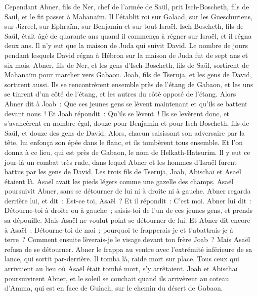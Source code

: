 \begin{multicols}{2}
Cependant Abner, fils de Ner, chef de l'armée de Saül, prit Isch-Boscheth, fils de Saül, et le fit passer à Mahanaïm.
Il l'établit roi sur Galaad, sur les Gueschuriens, sur Jizreel, sur Ephraïm, sur Benjamin et sur tout Israël.
Isch-Boscheth, fils de Saül, était âgé de quarante ans quand il commença à régner sur Israël, et il régna deux ans. Il n'y eut que la maison de Juda qui suivit David.
Le nombre de jours pendant lesquels David régna à Hébron sur la maison de Juda fut de sept ans et six mois.
Abner, fils de Ner, et les gens d'Isch-Boscheth, fils de Saül, sortirent de Mahanaïm pour marcher vers Gabaon.
Joab, fils de Tseruja, et les gens de David, sortirent aussi. Ils se rencontrèrent ensemble près de l'étang de Gabaon, et les uns se tinrent d'un côté de l'étang, et les autres du côté opposé de l'étang.
Alors Abner dit à Joab~: Que ces jeunes gens se lèvent maintenant et qu'ils se battent devant nous~! Et Joab répondit~: Qu'ils se lèvent~!
Ils se levèrent donc, et s'avancèrent en nombre égal, douze pour Benjamin et pour Isch-Boscheth, fils de Saül, et douze des gens de David.
Alors, chacun saisissant son adversaire par la tête, lui enfonça son épée dans le flanc, et ils tombèrent tous ensemble. Et l'on donna à ce lieu, qui est près de Gabaon, le nom de Helkath-Hatsurim.
Il y eut ce jour-là un combat très rude, dans lequel Abner et les hommes d'Israël furent battus par les gens de David.
Les trois fils de Tseruja, Joab, Abischaï et Asaël étaient là. Asaël avait les pieds légers comme une gazelle des champs.
Asaël poursuivit Abner, sans se détourner de lui ni à droite ni à gauche.
Abner regarda derrière lui, et dit~: Est-ce toi, Asaël~? Et il répondit~: C'est moi.
Abner lui dit~: Détourne-toi à droite ou à gauche~; saisis-toi de l'un de ces jeunes gens, et prends sa dépouille. Mais Asaël ne voulut point se détourner de lui.
Et Abner dit encore à Asaël~: Détourne-toi de moi~; pourquoi te frapperais-je et t'abattrais-je à terre~? Comment ensuite lèverais-je le visage devant ton frère Joab~?
Mais Asaël refusa de se détourner. Abner le frappa au ventre avec l'extrémité inférieure de sa lance, qui sortit par-derrière. Il tomba là, raide mort sur place. Tous ceux qui arrivaient au lieu où Asaël était tombé mort, s'y arrêtaient.
Joab et Abischaï poursuivirent Abner, et le soleil se couchait quand ils arrivèrent au coteau d'Amma, qui est en face de Guiach, sur le chemin du désert de Gabaon.

\end{multicols}
